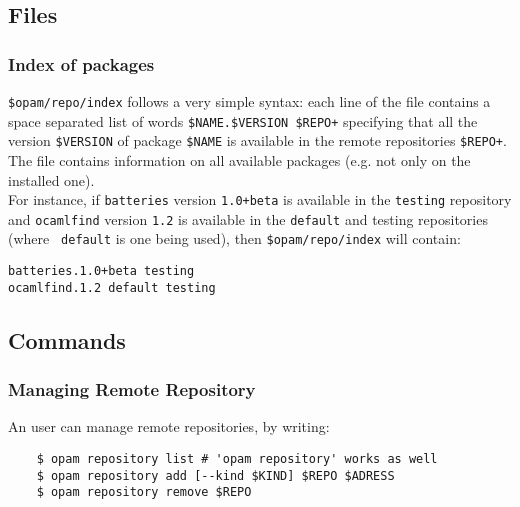\documentclass[a4paper,10pt]{article}
\begin{document}
\subsection{Files}

\subsubsection{Index of packages}
\label{file:index}

\verb+$opam/repo/index+ follows a very simple syntax: each line of the
file contains a space separated list of words
\verb|$NAME.$VERSION $REPO+| specifying that all the version
\verb+$VERSION+ of package \verb+$NAME+ is available in the remote
repositories \verb|$REPO+|. The file contains information on all
available packages (e.g. not only on the installed one). \\

For instance, if {\tt batteries} version {\tt 1.0+beta} is available
in the {\tt testing} repository and {\tt ocamlfind} version {\tt 1.2}
is available in the {\tt default} and testing repositories (where {\tt
  default} is one being used), then \verb+$opam/repo/index+ will
contain:

{\small
\begin{Verbatim}[frame=single]
batteries.1.0+beta testing
ocamlfind.1.2 default testing
\end{Verbatim}
}

\subsection{Commands}

\subsubsection{Managing Remote Repository}

An user can manage remote repositories, by writing:

\begin{verbatim}
    $ opam repository list # 'opam repository' works as well
    $ opam repository add [--kind $KIND] $REPO $ADRESS
    $ opam repository remove $REPO
\end{verbatim}
\end{document}

